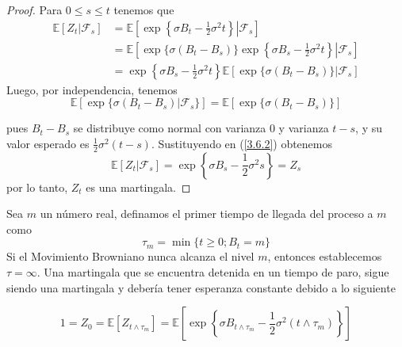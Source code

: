 \documentclass[11pt,notitlepage]{article}
\begin{document}
\begin{proof}
Para \(0 \leq s \leq t\) tenemos que
\begin{equation} \label{3.6.2}
    \begin{split}
        \mathbb{E}\left[Z_t|\mathcal{F}_s\right] &=  \mathbb{E}\left[\exp\left.\left\{\sigma B_t-\frac{1}{2}\sigma^2t\right\}\right|\mathcal{F}_s\right]\\
         &=  \mathbb{E}\left[\exp\{\sigma(B_t-B_s)\}\exp\left.\left\{\sigma B_s-\frac{1}{2}\sigma^2t\right\}\right|\mathcal{F}_s\right]\\
         &= \exp\left\{\sigma B_s-\frac{1}{2}\sigma^2t\right\} \mathbb{E}[\exp\{\sigma(B_t-B_s)\}|\mathcal{F}_s]
    \end{split}
\end{equation}
Luego, por independencia, tenemos 
\begin{equation*}
    \mathbb{E}[\exp \{\sigma(B_t-B_s)|\mathcal{F}_s\}]=\mathbb{E}[\exp \{\sigma(B_t-B_s)\}]
\end{equation*}

pues \(B_t-B_s\) se distribuye como normal con varianza \(0\) y varianza \(t-s\), y su valor esperado es \(\frac{1}{2}\sigma^2(t-s)\). Sustituyendo en (\ref{3.6.2}) obtenemos 
\begin{equation}
    \mathbb{E}[Z_t|\mathcal{F}_s]=\exp\left\{\sigma B_s-\frac{1}{2}\sigma^2s\right\}= Z_s
\end{equation}
por lo tanto, \(Z_t\) es una martingala. 
\end{proof}

Sea \(m\) un número real, definamos el primer tiempo de llegada del proceso a \(m\) como
\begin{equation} \label{3.6.3}
    \tau_m=\min\{t \geq 0; B_t=m\}
\end{equation}
Si el Movimiento Browniano nunca alcanza el nivel \(m\), entonces establecemos \(\tau=\infty\). Una martingala que se encuentra detenida en un tiempo de paro, sigue siendo una martingala y debería tener esperanza constante debido a lo siguiente

\begin{equation} \label{3.6.4}
    1= Z_0= \mathbb{E}\left[Z_{t\wedge \tau_m}\right]= \mathbb{E}\left[\exp \left\{\sigma B_{t\wedge \tau_m}-\frac{1}{2}\sigma^2(t\wedge \tau_m)\right\}\right]
\end{equation}
\end{document}
